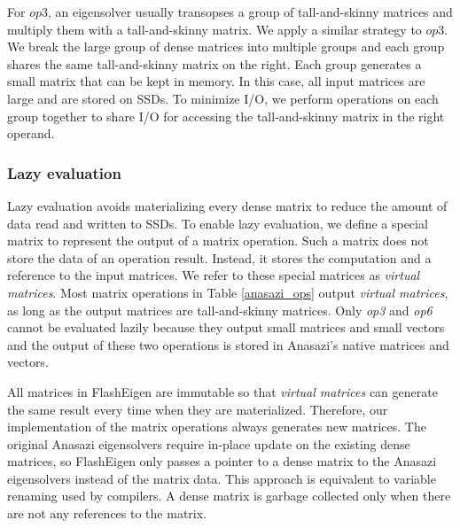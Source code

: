 For $op3$, an eigensolver usually transopses a group of tall-and-skinny matrices
and multiply them with a tall-and-skinny matrix. We apply a similar strategy to
$op3$. We break the large group of dense matrices into multiple groups and each
group shares the same tall-and-skinny matrix on the right. Each group generates
a small matrix that can be kept in memory. In this case, all input matrices
are large and are stored on SSDs. To minimize I/O, we perform operations on
each group together to share I/O for accessing the tall-and-skinny matrix
in the right operand.


\subsubsection{Lazy evaluation} \label{sec:lazy_eval}
Lazy evaluation avoids materializing every dense matrix to reduce the amount
of data read and written to SSDs.
To enable lazy evaluation, we define a special matrix to represent the output
of a matrix operation. Such a matrix does not store the data of
an operation result. Instead, it stores the computation and a reference to
the input matrices. We refer to these special matrices as \textit{virtual matrices}.
Most matrix operations in Table \ref{anasazi_ops} output \textit{virtual matrices},
as long as the output matrices are tall-and-skinny matrices. Only \textit{op3}
and \textit{op6} cannot be evaluated lazily because they output small matrices
and small vectors and the output of these two operations is stored in Anasazi's
native matrices and vectors.


All matrices in FlashEigen are immutable so that \textit{virtual matrices}
can generate the same result every time when they are materialized. Therefore,
our implementation of the matrix operations always generates new matrices.
The original Anasazi eigensolvers require in-place update on the existing dense
matrices, so FlashEigen only passes a pointer to a dense matrix to the Anasazi
eigensolvers instead of the matrix data. This approach is equivalent to variable
renaming used by compilers.
A dense matrix is garbage collected only when there are not any references to
the matrix.

